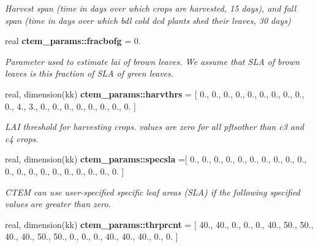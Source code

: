 \begin{DoxyCompactItemize}
\begin{DoxyCompactList}\small\item\em Harvest span (time in days over which crops are harvested, 15 days), and fall span (time in days over which bdl cold dcd plants shed their leaves, 30 days) \end{DoxyCompactList}\item 
\hypertarget{namespacectem__params_a220bfc3b9a9be5d41edb3eda82a2988e}{}real {\bfseries ctem\+\_\+params\+::fracbofg} = 0.\label{namespacectem__params_a220bfc3b9a9be5d41edb3eda82a2988e}

\begin{DoxyCompactList}\small\item\em Parameter used to estimate lai of brown leaves. We assume that S\+L\+A of brown leaves is this fraction of S\+L\+A of green leaves. \end{DoxyCompactList}\item 
\hypertarget{namespacectem__params_a3692335bc09fe9876e4054a0658982ff}{}real, dimension(kk) {\bfseries ctem\+\_\+params\+::harvthrs} = \mbox{[} 0., 0., 0., 0., 0., 0., 0., 0., 0., 0., 4., 3., 0., 0., 0., 0., 0., 0., 0., 0. \mbox{]}\label{namespacectem__params_a3692335bc09fe9876e4054a0658982ff}

\begin{DoxyCompactList}\small\item\em L\+A\+I threshold for harvesting crops. values are zero for all pftsother than c3 and c4 crops. \end{DoxyCompactList}\item 
\hypertarget{namespacectem__params_adc0f8a65d365deb6112b767066c25929}{}real, dimension(kk) {\bfseries ctem\+\_\+params\+::specsla} =\mbox{[} 0., 0., 0., 0., 0., 0., 0., 0., 0., 0., 0., 0., 0., 0., 0., 0., 0., 0., 0., 0. \mbox{]}\label{namespacectem__params_adc0f8a65d365deb6112b767066c25929}

\begin{DoxyCompactList}\small\item\em C\+T\+E\+M can use user-\/specified specific leaf areas (S\+L\+A) if the following specified values are greater than zero. \end{DoxyCompactList}\item 
\hypertarget{namespacectem__params_af5b1d396f621af177ae9b6011942df1c}{}real, dimension(kk) {\bfseries ctem\+\_\+params\+::thrprcnt} = \mbox{[} 40., 40., 0., 0., 0., 40., 50., 50., 40., 40., 50., 50., 0., 0., 0., 40., 40., 40., 0., 0. \mbox{]}\label{namespacectem__params_af5b1d396f621af177ae9b6011942df1c}


\end{DoxyCompactItemize}
